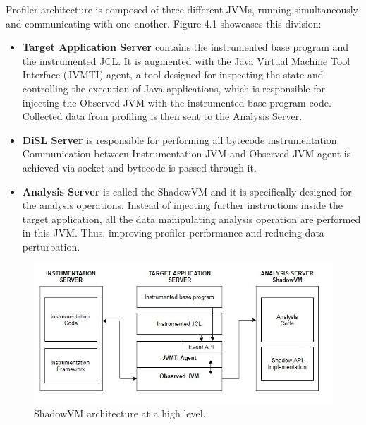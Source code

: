 \documentclass[]{usiinfthesis}
\begin{document}
Profiler architecture is composed of three different JVMs, running simultaneously and communicating with one another. Figure 4.1 showcases this division:
\begin{itemize}
    \item \textbf{Target Application Server}  contains the instrumented base program and the instrumented JCL. It is augmented with the Java Virtual Machine Tool Interface (JVMTI) agent, a tool designed for inspecting the state and controlling the execution of Java applications, which is responsible for injecting the Observed JVM with the instrumented base program code. Collected data from profiling is then sent to the Analysis Server.   
    \item \textbf{DiSL Server} is responsible for performing all bytecode instrumentation. Communication between Instrumentation JVM and Observed JVM agent is achieved via socket and bytecode is passed through it. 
    \item \textbf{Analysis Server} is called the ShadowVM  and it is specifically designed for the analysis operations. Instead of injecting further instructions inside the target application, all the data manipulating analysis operation are performed in this JVM. Thus, improving profiler performance and reducing data perturbation. 
\end{itemize}

\begin{figure}
    \centering
    \includegraphics[scale=0.7]{Immagini/DiSL_Architecture.JPG} 
    \caption{ShadowVM architecture at a high level. }
    \label{fig:fig1}
\end{figure}
\end{document}
